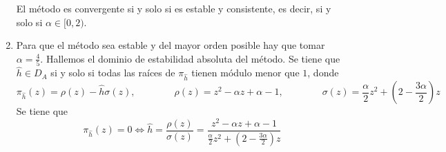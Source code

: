 \documentclass[11pt]{report}
\begin{document}
\begin{enumerate}
    El método es convergente si y solo si es estable y consistente, es decir, si y solo si $\alpha \in[0,2)$.

    \item Para que el método sea estable y del mayor orden posible hay que tomar $\alpha = \frac{4}{5}$. Hallemos el dominio de estabilidad absoluta del método. Se tiene que $\hat{h} \in D_A$ si y solo si todas las raíces de $\pi_{\hat{h}}$ tienen módulo menor que $1$, donde
    \[\pi_{\hat{h}}(z)=\rho(z)-\hat{h}\sigma(z), \qquad \qquad \rho(z)=z^2-\alpha z+\alpha-1, \qquad \qquad \sigma(z)=\frac{\alpha}{2}z^2+\left(2-\frac{3\alpha}{2}\right)z\]
    Se tiene que
    \[\pi_{\hat{h}}(z)=0 \iff \hat{h} = \frac{\rho(z)}{\sigma(z)} = \frac{z^2-\alpha z+\alpha-1}{\frac{\alpha}{2}z^2+\left(2-\frac{3\alpha}{2}\right)z}\]
\end{enumerate}
\end{document}
